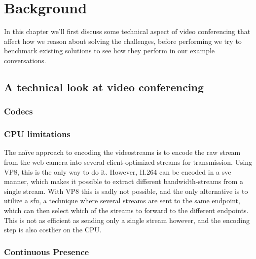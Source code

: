 \chapter{Background}
\label{chp:background}

In this chapter we'll first discuss some technical aspect of video conferencing that affect how we reason about solving the challenges, before performing we try to benchmark existing solutions to see how they perform in our example conversations.


\section{A technical look at video conferencing}

\subsection{Codecs}


\subsection{CPU limitations}

The naïve approach to encoding the videostreams is to encode the raw stream from the web camera into several client-optimized streams for transmission. Using VP8, this is the only way to do it. However, H.264 can be encoded in a \gls{svc} manner, which makes it possible to extract different bandwidth-streams from a single stream. With VP8 this is sadly not possible, and the only alternative is to utilize a \gls{sfu}, a technique where several streams are sent to the same endpoint, which can then select which of the streams to forward to the different endpoints. This is not as efficient as sending only a single stream however, and the encoding step is also costlier on the CPU.

\subsection{Continuous Presence}



